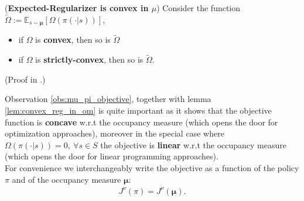 \begin{lemma}
    \label{lem:convex_reg_in_om} (\textbf{Expected-Regularizer is convex in $\mu$}) Consider the function $\tilde{\Omega}:=\mathbb{E}_{s \sim \bm{\mu}}[\Omega(\pi(\cdot|s))]$,
    \begin{itemize}
        \item if $\Omega$ is \textbf{convex}, then so is $\tilde{\Omega}$
        \item if $\Omega$ is \textbf{strictly-convex}, then so is $\tilde{\Omega}$.
    \end{itemize}
    (Proof in \cite{Schlaginhaufen2023}.)
\end{lemma}

Observation \ref{obs:mu_pi_objective}, together with lemma \ref{lem:convex_reg_in_om} is quite important as it shows that the objective function is \textbf{concave} w.r.t the occupancy measure (which opens the door for optimization approaches), moreover in the special case where $\Omega(\pi(\cdot|s)) = 0, ~\forall s \in S $ the objective is \textbf{linear} w.r.t the occupancy measure (which opens the door for linear programming approaches). \\
For convenience we interchangeably write the objective as a function of the policy $\pi$ and of the occupancy measure $\bm{\mu}$:
\begin{align*}
    J^\nu(\pi) =  J^\nu(\bm{\mu}).
\end{align*} \\


